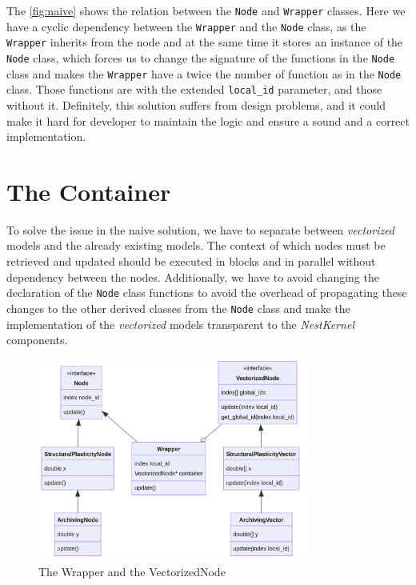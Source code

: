The \autoref{fig:naive} shows the relation between the \texttt{Node} and \texttt{Wrapper} classes. Here we have a cyclic dependency between the \texttt{Wrapper} and the \texttt{Node} class, as the \texttt{Wrapper} inherits from the node and at the same time it stores an instance of the \texttt{Node} class, which forces us to change the signature of the functions in  the \texttt{Node} class and makes the \texttt{Wrapper} have a twice the number of function as in the \texttt{Node} class. Those functions are with the extended \texttt{local\_id} parameter, and those without it. Definitely, this solution suffers from design problems, and it could make it hard for developer to maintain the logic and ensure a sound  and a correct implementation.

\section{The Container}

To solve the issue in the naive solution, we have to separate between \emph{vectorized} models and the already existing models. The context of which nodes must be retrieved and updated should be executed in blocks and in parallel without dependency between the nodes. Additionally, we have to avoid changing the declaration of the \texttt{Node} class functions to avoid the overhead of propagating these changes to the other derived classes from the \texttt{Node} class and make the implementation of the \emph{vectorized} models transparent to the \emph{NestKernel} components.



\begin{figure}[h!]
\centering
\includegraphics[width=0.8\textwidth]{src/pic/wrapper_node.png}
\caption{The Wrapper and the VectorizedNode}
\label{fig:container}
\end{figure}

